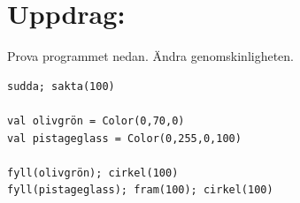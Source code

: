 \section*{\color{BrickRed}Uppdrag:}
Prova programmet nedan. Ändra genomskinligheten.

  

\begin{lstlisting}[basicstyle={\ttfamily\fontsize{16}{19}\selectfont},numbers=none]
sudda; sakta(100)      

val olivgrön = Color(0,70,0)
val pistageglass = Color(0,255,0,100)

fyll(olivgrön); cirkel(100)
fyll(pistageglass); fram(100); cirkel(100)
\end{lstlisting}
        
